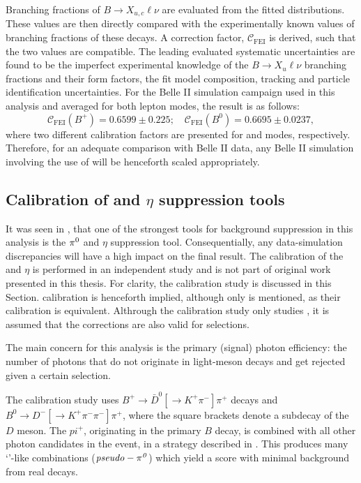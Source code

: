 Branching fractions of $B\rightarrow X_{u,c}\ell\nu$ are evaluated from the fitted distributions.
These values are then directly compared with the experimentally known values of branching fractions of these decays.
A correction factor, $\mathcal{C}_{\mathrm{FEI}}$ is derived, such that the two values are compatible.
The leading evaluated systematic uncertainties are found to be the imperfect experimental knowledge of the $B\rightarrow X_u\ell\nu$ branching fractions and their form factors, the fit model composition, tracking and particle identification uncertainties.
For the Belle II simulation campaign used in this analysis and averaged for both lepton modes, the result is as follows:
\begin{equation}\label{eq:fei_calibration}
    \mathcal{C}_{\mathrm{FEI}}(B^+) = 0.6599 \pm 0.225; \quad \mathcal{C}_{\mathrm{FEI}}(B^0) = 0.6695 \pm 0.0237,
\end{equation}
where two different calibration factors are presented for \feiBp and \feiBz modes, respectively.
Therefore, for an adequate comparison with Belle II data, any Belle II simulation involving the use of \FEI will be henceforth scaled appropriately.

\subsection{Calibration of \texorpdfstring{\piz}{pi0} and \texorpdfstring{$\eta$}{eta} suppression tools}\label{sec:piz_eta_calibration}
It was seen in , that one of the strongest tools for background suppression in this analysis is the $\pi^0$ and $\eta$ suppression tool.
Consequentially, any data-simulation discrepancies will have a high impact on the final result.
The calibration of the \piz and $\eta$ is performed in an independent study and is not part of original work presented in this thesis.
For clarity, the calibration study is discussed in this Section.
\etaVeto calibration is henceforth implied, although only \piVeto is mentioned, as their calibration is equivalent.
Althrough the calibration study only studies \piVeto, it is assumed that the corrections are also valid for \etaVeto selections.

The main concern for this analysis is the primary (signal) photon efficiency: the number of photons that do not originate in light-meson decays and get rejected given a certain \piVeto selection.

The calibration study uses $B^+\to \bar{D}^0[\to K^+\pi^-]\pi^+$ decays and $B^0\to D^-[\to K^+\pi^-\pi^-]\pi^+$, where the square brackets denote a subdecay of the $D$ meson.
The $pi^+$, originating in the primary $B$ decay, is combined with all other photon candidates in the event, in a strategy described in .
This produces many `\piz'-like combinations ($\mathit{pseudo-\pi^0}$) which yield a \piVeto score with minimal background from real \piz decays.

